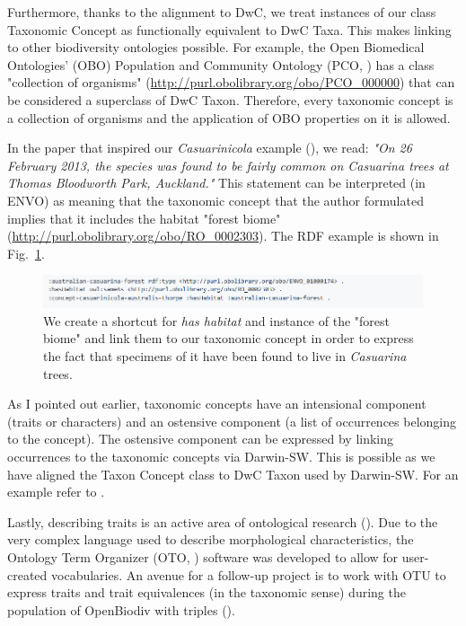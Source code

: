 Furthermore, thanks to the alignment to DwC, we treat instances of our class Taxonomic Concept as functionally equivalent to DwC Taxa. This makes linking to other biodiversity ontologies possible. For example, the Open Biomedical Ontologies' (OBO) Population and Community Ontology (PCO, \cite{walls_semantics_2014}) has a class "collection of organisms" (\url{http://purl.obolibrary.org/obo/PCO_000000}) that can be considered a superclass of DwC Taxon. Therefore, every taxonomic concept is a collection of organisms and the application of OBO properties on it is allowed.

In the paper that inspired our \emph{Casuarinicola} example (\cite{thorpe_casuarinicola_2013}), we read: \emph{"On 26 February 2013, the species was found to be fairly common on Casuarina trees at Thomas Bloodworth Park, Auckland."} This statement can be interpreted (in ENVO) as meaning that the taxonomic concept that the author formulated implies that it includes the habitat "forest biome" (\url{http://purl.obolibrary.org/obo/RO_0002303}). The RDF example is shown in Fig.~\ref{example-envo}.

\begin{figure}[h!]
\centering
  \includegraphics[width=\textwidth]{Figures/example-envo}
  \decoRule
  \caption[Example of combining ENVO with OpenBiodiv-O.]{We create a shortcut for \emph{has habitat} and instance of the "forest biome" and link them to our taxonomic concept in order to express the fact that specimens of it have been found to live in \emph{Casuarina} trees.}
  \label{example-envo}
\end{figure}

As I pointed out earlier, taxonomic concepts have an intensional component (traits or characters) and an ostensive component (a list of occurrences belonging to the concept). The ostensive component can be expressed by linking occurrences to the taxonomic concepts via Darwin-SW. This is possible as we have aligned the Taxon Concept class to DwC Taxon used by Darwin-SW. For an example refer to \cite{baskauf_darwin-sw:_2016}.

Lastly, describing traits is an active area of ontological research (\cite{huang_oto:_2015}). Due to the very complex language used to describe morphological characteristics, the Ontology Term Organizer (OTO, \cite{huang_oto:_2015}) software was developed to allow for user-created vocabularies. An avenue for a follow-up project is to work with OTU to express traits and trait equivalences (in the taxonomic sense) during the population of OpenBiodiv with triples (\cite{hong_explorer_2018}).

